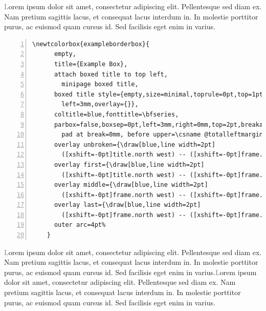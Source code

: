 \documentclass{article}
\def\gray{\textcolor{gray}}
\def\loremI{Lorem ipsum dolor sit amet, consectetur adipiscing elit. 
Pellentesque sed diam ex. Nam pretium sagittis lacus, et consequat lacus 
interdum in. In molestie porttitor purus, ac euismod quam cursus id. 
Sed facilisis eget enim in varius.}
\def\lorem{\gray\loremI}
\begin{document}


\begin{exampleborderbox}
  \lorem
  \begin{lstlisting}[backgroundcolor=\color{backcolor},numbers=left,gobble=4,numbersep=3pt,xleftmargin=5pt,lineskip=-.7ex,alsoletter=\\]
    \newtcolorbox{exampleborderbox}{
      empty,
      title={Example Box},
      attach boxed title to top left,
        minipage boxed title,
      boxed title style={empty,size=minimal,toprule=0pt,top=1pt,
        left=3mm,overlay={}},
      coltitle=blue,fonttitle=\bfseries,
      parbox=false,boxsep=0pt,left=3mm,right=0mm,top=2pt,breakable,
        pad at break=0mm, before upper=\csname @totalleftmargin\endcsname0pt, 
      overlay unbroken={\draw[blue,line width=2pt] 
        ([xshift=-0pt]title.north west) -- ([xshift=-0pt]frame.south west); },
      overlay first={\draw[blue,line width=2pt] 
        ([xshift=-0pt]title.north west) -- ([xshift=-0pt]frame.south west); },
      overlay middle={\draw[blue,line width=2pt] 
        ([xshift=-0pt]frame.north west) -- ([xshift=-0pt]frame.south west); },
      overlay last={\draw[blue,line width=2pt] 
        ([xshift=-0pt]frame.north west) -- ([xshift=-0pt]frame.south west); },
      outer arc=4pt%
    }
  \end{lstlisting}
  \begin{mdframed}
    \lorem \lorem
  \end{mdframed}
\end{exampleborderbox}

\end{document}
